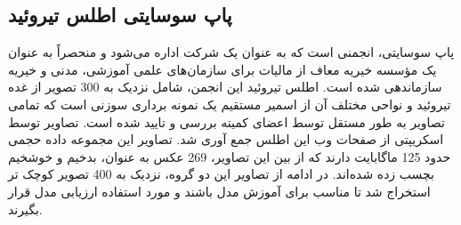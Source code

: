 \subsection{پاپ سوسایتی اطلس تیروئید}\label{subsec:پاپ-سوسایتی}
پاپ سوسایتی، انجمنی است که به عنوان یک شرکت اداره می‌شود و منحصراً به عنوان یک مؤسسه خیریه معاف از مالیات برای سازمان‌های علمی آموزشی، مدنی و خیریه سازماندهی شده است.
اطلس تیروئید این انجمن\cite{papsocietyiamgeatlas}، شامل نزدیک به 300 تصویر از غده تیروئید و نواحی مختلف آن از اسمیر مستقیم یک نمونه برداری سوزنی است که تمامی تصاویر به طور مستقل توسط اعضای کمیته بررسی و تایید شده است.
تصاویر توسط اسکریپتی از صفحات وب این اطلس جمع آوری شد. تصاویر این مجموعه داده حجمی حدود 125 ماگابایت دارند که از بین این تصاویر، 269 عکس به عنوان، بدخیم و خوشخیم بچسب زده شده‌اند. در ادامه از تصاویر این دو گروه، نزدیک به 400 تصویر کوچک تر استخراج شد تا مناسب برای آموزش مدل باشند و مورد استفاده ارزیابی مدل قرار بگیرند.